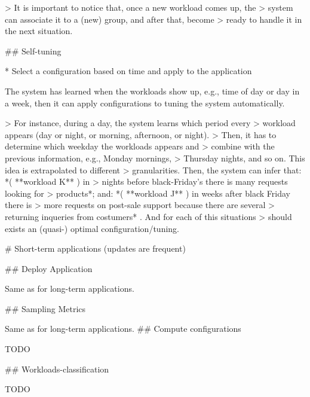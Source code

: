 > It is important to notice that, once a new workload comes up, the
> system can associate it to a (new) group, and after that, become
> ready to handle it in the next situation.


## Self-tuning

* Select a configuration based on time and apply to the application

The system has learned when the workloads show up, e.g., time of day
or day in a week, then it can apply configurations to tuning the
system automatically.

> For instance, during a day, the system learns which period every
> workload appears (day or night, or morning, afternoon, or night).
> Then, it has to determine which weekday the workloads appears and
> combine with the previous information, e.g., Monday mornings,
> Thursday nights, and so on. This idea is extrapolated to different
> granularities. Then, the system can infer that: *( **workload K** ) in
> nights before black-Friday's there is many requests looking for
> products*; and: *( **workload J** ) in weeks after black Friday there is
> more requests on post-sale support because there are several
> returning inqueries from costumers* . And for each of this situations
> should exists an (quasi-) optimal configuration/tuning.

# Short-term applications (updates are frequent)

## Deploy Application

Same as for long-term applications.

## Sampling Metrics

Same as for long-term applications.
## Compute configurations

TODO

## Workloads-classification

TODO
